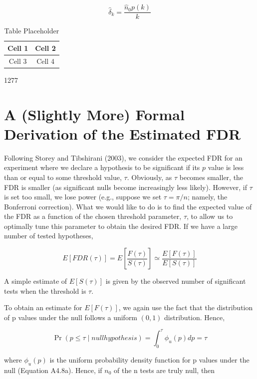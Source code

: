\documentclass{article}
\begin{document}
\begin{equation}
\widehat{\delta}_{k}=\frac{\widehat{n}_{0}p(k)}{k}
\end{equation}

\begin{table}[h]
\centering
\begin{tabular}{|c|c|}
\hline
Cell 1 & Cell 2 \\
\hline
Cell 3 & Cell 4 \\
\hline
\end{tabular}
\caption{Table Placeholder}
\end{table}

1277

\section{A (Slightly More) Formal Derivation of the Estimated FDR}
Following Storey and Tibshirani (2003), we consider the expected FDR for an experiment where we declare a hypothesis to be significant if its $p$ value is less than or equal to some threshold value, $\tau$. Obviously, as $\tau$ becomes smaller, the FDR is smaller (as significant nulls become increasingly less likely). However, if $\tau$ is set too small, we lose power (e.g., suppose we set $\tau = \pi/n$; namely, the Bonferroni correction). What we would like to do is to find the expected value of the FDR as a function of the chosen threshold parameter, $\tau$, to allow us to optimally tune this parameter to obtain the desired FDR. If we have a large number of tested hypotheses,

\begin{equation}
E[F D R(\tau)]=E\left[\frac{F(\tau)}{S(\tau)}\right]\simeq\frac{E[F(\tau)]}{E[S(\tau)]}
\end{equation}

A simple estimate of  $ E[S(\tau)] $ is given by the observed number of significant tests when the threshold is  $ \tau $.

To obtain an estimate for  $ E[F(\tau)] $, we again use the fact that the distribution of p values under the null follows a uniform  $ (0,1) $ distribution. Hence,

\begin{equation}
\Pr(p\leq\tau\mid null hypothesis)=\int_{0}^{\tau}\phi_{u}(p)dp=\tau
\end{equation}

where  $ \phi_{u}(p) $ is the uniform probability density function for p values under the null (Equation A4.8a). Hence, if  $ n_{0} $ of the n tests are truly null, then
\end{document}
